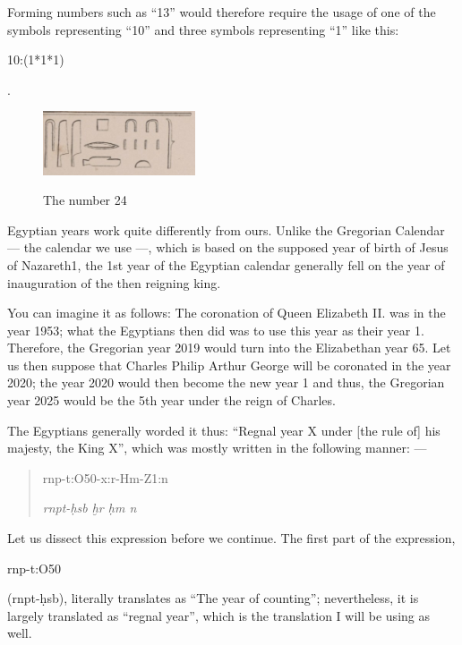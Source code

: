 \documentclass[a5paper,twoside,11pt]{report}
\newcommand{\xHiero}{ḫ}
\newcommand{\HHiero}{ḥ}
\begin{document}
		Forming numbers such as “13” would therefore require the usage of one of the symbols representing “10” and three symbols representing “1” like this: \begin{hieroglyph}10:(1*1*1)\end{hieroglyph}.

		  \begin{figure}
				\centering
				\includegraphics[width=0.4\textwidth]{images/img5.jpg}
				\caption{The number 24}
				\cite{NYC:Ernst_Ptolost}
			\end{figure}

			Egyptian years work quite differently from ours. Unlike the Gregorian Calendar — the calendar we use —, which is based on the supposed year of birth of Jesus of Nazareth1, the 1st year of the Egyptian calendar generally fell on the year of inauguration of the then reigning king.

			You can imagine it as follows: The coronation of Queen Elizabeth II. was in the year 1953; what the Egyptians then did was to use this year as their year 1. Therefore, the Gregorian year 2019 would turn into the Elizabethan year 65. Let us then suppose that Charles Philip Arthur George will be coronated in the year 2020; the year 2020 would then become the new year 1 and thus, the  Gregorian year 2025 would be the 5th year under the reign of Charles. 

			The Egyptians generally worded it thus: “Regnal year X under [the rule of] his majesty, the King X”, which was mostly written in the following manner: —

			\begin{quote}
				\begin{hieroglyph}
					rnp-t:O50-x:r-Hm-Z1:n
				\end{hieroglyph}
				\newline
				\textit{rnpt-\HHiero sb \xHiero r \HHiero m n}
			\end{quote}

			Let us dissect this expression before we continue. The first part of the expression, \begin{hieroglyph}rnp-t:O50\end{hieroglyph} (rnpt-ḥsb), literally translates as “The year of counting”; nevertheless, it is largely translated as “regnal year”, which is the translation I will be using as well.
\end{document}
